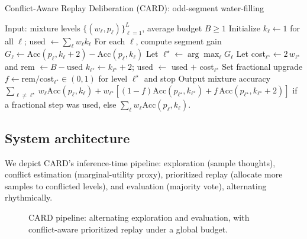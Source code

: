 \documentclass[11pt]{article}
\begin{document}
\begin{algorithm}[h]
\caption{Conflict-Aware Replay Deliberation (CARD): odd-segment water-filling}
\label{alg:card}
\begin{algorithmic}[1]
\STATE Input: mixture levels $\{(w_\ell,p_\ell)\}_{\ell=1}^L$, average budget $B \ge 1$
\STATE Initialize $k_\ell \leftarrow 1$ for all $\ell$; used $\leftarrow \sum_\ell w_\ell k_\ell$
  \STATE For each $\ell$, compute segment gain $G_\ell \leftarrow \mathrm{Acc}(p_\ell,k_\ell{+}2) - \mathrm{Acc}(p_\ell,k_\ell)$
  \STATE Let $\ell^\star \leftarrow \arg\max_\ell G_\ell$
  \STATE Let cost$_{\ell^\star} \leftarrow 2\,w_{\ell^\star}$ and rem $\leftarrow B - \text{used}$
    \STATE $k_{\ell^\star} \leftarrow k_{\ell^\star} + 2$; used $\leftarrow$ used $+$ cost$_{\ell^\star}$
  \ELSE
    \STATE Set fractional upgrade $f \leftarrow \mathrm{rem}/\text{cost}_{\ell^\star}\in(0,1)$ for level $\ell^\star$ and stop
  \ENDIF
\ENDWHILE
\STATE Output mixture accuracy $\sum_{\ell\neq \ell^\star} w_\ell \mathrm{Acc}(p_\ell,k_\ell) + w_{\ell^\star}\!\left[(1{-}f)\mathrm{Acc}(p_{\ell^\star},k_{\ell^\star}) + f\,\mathrm{Acc}(p_{\ell^\star},k_{\ell^\star}{+}2)\right]$ if a fractional step was used, else $\sum_{\ell} w_\ell \mathrm{Acc}(p_\ell,k_\ell)$.
\end{algorithmic}
\end{algorithm}

\subsection{System architecture}
We depict CARD’s inference-time pipeline: exploration (sample thoughts), conflict estimation (marginal-utility proxy), prioritized replay (allocate more samples to conflicted levels), and evaluation (majority vote), alternating rhythmically.
\begin{figure}[h]
\centering
{}
\caption{CARD pipeline: alternating exploration and evaluation, with conflict-aware prioritized replay under a global budget.}
\label{fig:arch}
\end{figure}
\end{document}
